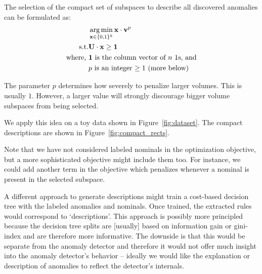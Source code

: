 \documentclass{article} %
\DeclareMathOperator*{\argmin}{arg\,min}
\begin{document}
The selection of the compact set of subspaces to describe all discovered anomalies can be formulated as:
\begin{align}
& \argmin_{{\bf x} \in \{0, 1\}^k} {\bf x} \cdot {\bf v}^p \label{eqn:opt} \\
\text{s.t.} & {\bf U} \cdot {\bf x} \geq {\bf 1} \nonumber \\
\text{where, } & \text{${\bf 1}$ is the column vector of $n$ 1s, and} \nonumber \\
& \text{$p$ is an integer $\geq 1$ (more below)} \nonumber
\end{align}

The parameter $p$ determines how severely to penalize larger volumes. This is usually $1$. However, a larger value will strongly discourage bigger volume subspaces from being selected.

We apply this idea on a toy data shown in Figure~\ref{fig:dataset}. The compact descriptions are shown in Figure~\ref{fig:compact_rects}.

Note that we have not considered labeled nominals in the optimization objective, but a more sophisticated objective might include them too. For instance, we could add another term in the objective which penalizes whenever a nominal is present in the selected subspace.

A different approach to generate descriptions might train a cost-based decision tree with the labeled anomalies and nominals. Once trained, the extracted rules would correspond to `descriptions'. This approach is possibly more principled because the decision tree splits are [usually] based on information gain or gini-index and are therefore more informative. The downside is that this would be separate from the anomaly detector and therefore it would not offer much insight into the anomaly detector's behavior -- ideally we would like the explanation or description of anomalies to reflect the detector's internals.
\end{document}

